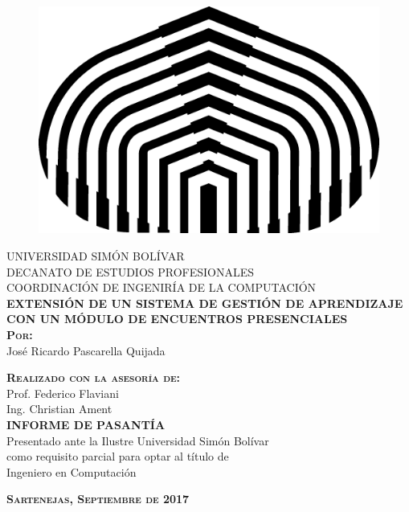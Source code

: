 \thispagestyle{empty} %
\begin{center}

\begin{figure}[h]
\begin{center}
\includegraphics{logos/logoUSB.png}
\end{center}
\end{figure}

\textsc{UNIVERSIDAD SIMÓN BOLÍVAR}\\
\textsc{DECANATO DE ESTUDIOS PROFESIONALES}\\
\textsc{COORDINACIÓN DE INGENIRÍA DE LA COMPUTACIÓN}\\[8em]

\textsc{\Large \textbf{EXTENSIÓN DE UN SISTEMA DE GESTIÓN DE APRENDIZAJE CON UN MÓDULO DE ENCUENTROS PRESENCIALES}}\\[4em]

\textsc{ \textbf{Por:} }\\
José Ricardo Pascarella Quijada

\textsc{ \textbf{Realizado con la asesoría de:} }\\
Prof. Federico Flaviani \\
Ing. Christian Ament\\[4em]

\textsc{ \textbf{INFORME DE PASANTÍA} }\\
Presentado ante la Ilustre Universidad Simón Bolívar\\
como requisito parcial para optar al título de \\
Ingeniero en Computación

\vspace*{\fill}

\textsc{ \textbf{Sartenejas, Septiembre de 2017} }
\end{center}
